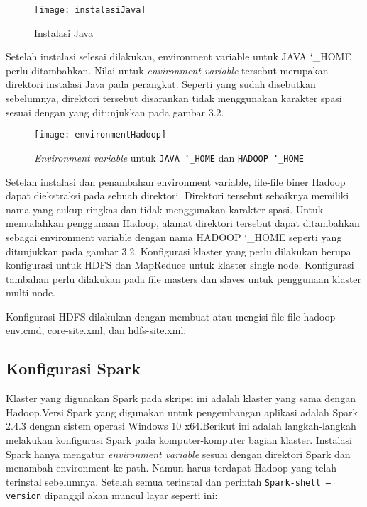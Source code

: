 \begin{figure}[H] 
	\centering  
	\texttt{[image: instalasiJava]}  
	\caption[Gambar Instalasi Java]{Instalasi Java} 
	\label{fig:Java-instalation} 
\end{figure}
 
Setelah instalasi selesai dilakukan, environment variable untuk JAVA \char`_HOME perlu ditambahkan.
Nilai untuk \textit{environment variable} tersebut merupakan direktori instalasi Java pada perangkat. Seperti yang sudah disebutkan sebelumnya, direktori tersebut disarankan tidak menggunakan karakter spasi sesuai dengan yang ditunjukkan pada gambar 3.2.

\begin{figure}[H] 
	\centering  
	\texttt{[image: environmentHadoop]}  
	\caption[Gambar HADOO PHOME]{\textit{Environment variable} untuk \texttt{JAVA \char`_HOME} dan
	\texttt{HADOOP \char`_HOME}} 
	\label{fig:Hadoop-home} 
\end{figure}

Setelah instalasi dan penambahan environment variable, file-file biner Hadoop dapat diekstraksi
pada sebuah direktori. Direktori tersebut sebaiknya memiliki nama yang cukup ringkas dan
tidak menggunakan karakter spasi. Untuk memudahkan penggunaan Hadoop, alamat direktori
tersebut dapat ditambahkan sebagai environment variable dengan nama HADOOP \char`_HOME seperti yang
ditunjukkan pada gambar 3.2.
Konfigurasi klaster yang perlu dilakukan berupa konfigurasi untuk HDFS dan MapReduce untuk
klaster single node. Konfigurasi tambahan perlu dilakukan pada file masters dan slaves untuk
penggunaan klaster multi node.

Konfigurasi HDFS dilakukan dengan membuat atau mengisi file-file hadoop-env.cmd, core-site.xml,
dan hdfs-site.xml.

\subsection{Konfigurasi Spark}
Klaster yang digunakan Spark pada skripsi ini adalah klaster yang sama dengan Hadoop.Versi
Spark yang digunakan untuk pengembangan aplikasi adalah Spark 2.4.3 dengan sistem operasi Windows 10 x64.Berikut ini adalah langkah-langkah melakukan konfigurasi Spark pada komputer-komputer
bagian klaster. Instalasi Spark hanya mengatur \textit{environment variable} sesuai dengan direktori Spark dan menambah environment ke path. Namun harus terdapat Hadoop yang telah terinstal sebelumnya.
Setelah semua terinstal dan perintah \texttt{Spark-shell --version} dipanggil akan muncul layar seperti ini:

